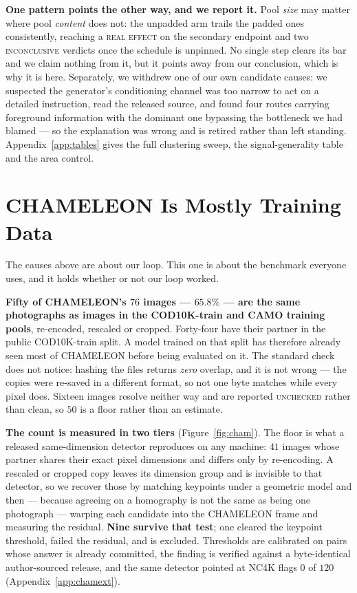 \documentclass{article} %
\begin{document}
\textbf{One pattern points the other way, and we report it.} Pool \emph{size} may matter where pool
\emph{content} does not: the unpadded arm trails the padded ones consistently, reaching a
\textsc{real effect} on the secondary endpoint and two \textsc{inconclusive} verdicts once the
schedule is unpinned. No single step clears its bar and we claim nothing from it, but it points away
from our conclusion, which is why it is here. Separately, we withdrew one of our own candidate
causes: we suspected the generator's conditioning channel was too narrow to act on a detailed
instruction, read the released source, and found four routes carrying foreground information with
the dominant one bypassing the bottleneck we had blamed --- so the explanation was wrong and is
retired rather than left standing. Appendix~\ref{app:tables} gives the full clustering sweep, the
signal-generality table and the area control.

\section{CHAMELEON Is Mostly Training Data}
\label{sec:contamination}
The causes above are about our loop. This one is about the benchmark everyone uses, and it holds
whether or not our loop worked.

\textbf{Fifty of CHAMELEON's $76$ images --- $65.8\%$ --- are the same photographs as images in the
COD10K-train and CAMO training pools}, re-encoded, rescaled or cropped. Forty-four have their
partner in the public COD10K-train split. A model trained on that split has therefore already seen
most of CHAMELEON before being evaluated on it. The standard check does not notice: hashing the
files returns \emph{zero} overlap, and it is not wrong --- the copies were re-saved in a different
format, so not one byte matches while every pixel does. Sixteen images resolve neither way and are
reported \textsc{unchecked} rather than clean, so $50$ is a floor rather than an estimate.

\textbf{The count is measured in two tiers} (Figure~\ref{fig:cham}). The floor is what a released
same-dimension detector reproduces on any machine: $41$ images whose partner shares their exact
pixel dimensions and differs only by re-encoding. A rescaled or cropped copy leaves its dimension
group and is invisible to that detector, so we recover those by matching keypoints under a geometric
model and then --- because agreeing on a homography is not the same as being one photograph ---
warping each candidate into the CHAMELEON frame and measuring the residual. \textbf{Nine survive
that test}; one cleared the keypoint threshold, failed the residual, and is excluded. Thresholds are
calibrated on pairs whose answer is already committed, the finding is verified against a
byte-identical author-sourced release, and the same detector pointed at NC4K flags $0$ of $120$
(Appendix~\ref{app:chamext}).
\end{document}
